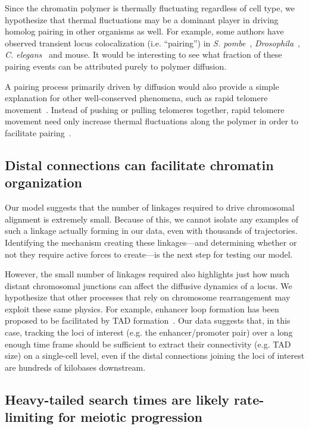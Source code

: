 \documentclass[9pt,twocolumn,twoside,lineno]{pnas-new}
\begin{document}
Since the chromatin polymer is thermally fluctuating regardless of cell type, we hypothesize that thermal fluctuations may be a dominant player in driving homolog pairing in other organisms as well. For example, some authors have observed transient locus colocalization (i.e. ``pairing'') in \textit{S. pombe}~\cite{chacon2016}, \textit{Drosophila}~\cite{vazquez2002}, \textit{C. elegans}~\cite{wynne2012} and mouse. It would be interesting to see what fraction of these pairing events can be attributed purely to polymer diffusion.

A pairing process primarily driven by diffusion would also provide a simple explanation for other well-conserved phenomena, such as rapid telomere movement~\cite{lee2015,conrad2008,wang2008}. Instead of pushing or pulling telomeres together, rapid telomere movement need only increase thermal fluctuations along the polymer in order to facilitate pairing~\cite{marshall2016}.

\subsection*{Distal connections can facilitate chromatin organization}

Our model suggests that the number of linkages required to drive chromosomal alignment is extremely small. Because of this, we cannot isolate any examples of such a linkage actually forming in our data, even with thousands of trajectories. Identifying the mechanism creating these linkages---and determining whether or not they require active forces to create---is the next step for testing our model.

However, the small number of linkages required also highlights just how much distant chromosomal junctions can affect the diffusive dynamics of a locus.
We hypothesize that other processes that rely on chromosome rearrangement may exploit these same physics.
For example, enhancer loop formation has been proposed to be facilitated by TAD formation~\cite{galupa2020}.
Our data suggests that, in this case, tracking the loci of interest (e.g. the enhancer/promoter pair) over a long enough time frame should be sufficient to extract their connectivity (e.g. TAD size) on a single-cell level, even if the distal connections joining the loci of interest are hundreds of kilobases downstream.

\subsection*{Heavy-tailed search times are likely rate-limiting for meiotic progression}
\end{document}
